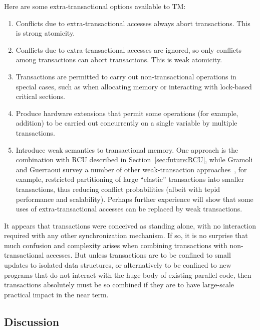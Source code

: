Here are some extra-transactional options available to TM:

\begin{enumerate}
\item	Conflicts due to extra-transactional accesses always abort
	transactions.
	This is strong atomicity.
\item	Conflicts due to extra-transactional accesses are ignored,
	so only conflicts among transactions can abort transactions.
	This is weak atomicity.
\item	Transactions are permitted to carry out non-transactional
	operations in special cases, such as when allocating memory or
	interacting with lock-based critical sections.
\item	Produce hardware extensions that permit some operations
	(for example, addition) to be carried out concurrently on a
	single variable by multiple transactions.
\item	Introduce weak semantics to transactional memory.
	One approach is the combination with RCU described in
	Section~\ref{sec:future:RCU}, while Gramoli and Guerraoui
	survey a number of other weak-transaction
	approaches~\cite{Gramoli:2014:DTP:2541883.2541900}, for example,
	restricted partitioning of large
	``elastic'' transactions into smaller transactions, thus
	reducing conflict probabilities (albeit with tepid performance
	and scalability).
	Perhaps further experience will show that some uses of
	extra-transactional accesses can be replaced by weak
	transactions.
\end{enumerate}

It appears that transactions were conceived as standing alone, with no
interaction required with any other synchronization mechanism.
If so, it is no surprise that much confusion and complexity arises when
combining transactions with non-transactional accesses.
But unless transactions are to be confined to small updates to isolated
data structures, or alternatively to be confined to new programs
that do not interact with the huge body of existing parallel code,
then transactions absolutely must be so combined if they are to have
large-scale practical impact in the near term.


\subsection{Discussion}
\label{sec:future:Discussion}

